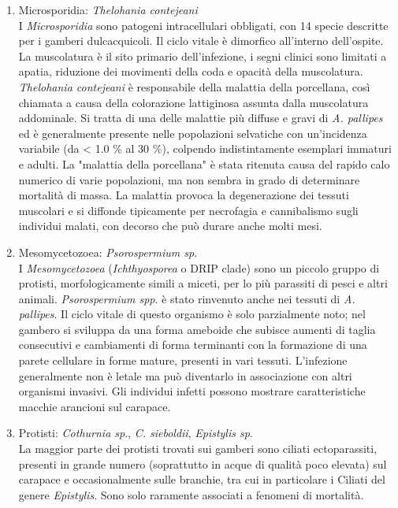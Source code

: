 \documentclass[11pt,a4paper,italian,twoside,openany]{memoir}
\begin{document}
\begin{enumerate}[label={\alph*)}]
  \item Microsporidia: \emph{Thelohania contejeani}\\ 
  I \emph{Microsporidia} sono patogeni intracellulari obbligati, con 14 specie descritte per i gamberi dulcacquicoli. Il ciclo vitale è dimorfico all'interno dell'ospite. La muscolatura è il sito primario dell'infezione, i segni clinici sono limitati a apatia, riduzione dei movimenti della coda e opacità della muscolatura. \emph{Thelohania contejeani} è responsabile della malattia della porcellana, così chiamata a causa della colorazione lattiginosa assunta dalla muscolatura addominale. Si tratta di una delle malattie più diffuse e gravi di \emph{A. pallipes} ed è generalmente presente nelle popolazioni selvatiche con un'incidenza variabile (da < 1.0 \% al 30 \%), colpendo indistintamente esemplari immaturi e adulti. La "malattia della porcellana" è stata ritenuta causa del rapido calo numerico di varie popolazioni, ma non sembra in grado di determinare mortalità di massa. La malattia provoca la degenerazione dei tessuti muscolari e si diffonde tipicamente per necrofagia e cannibalismo sugli individui malati, con decorso che può durare anche molti mesi. 
  \item Mesomycetozoea: \emph{Psorospermium sp}.\\ 
  I \emph{Mesomycetozoea} (\emph{Ichthyosporea} o DRIP clade) sono un piccolo gruppo di protisti, morfologicamente simili a miceti, per lo più parassiti di pesci e altri animali. \emph{Psorospermium spp}. è stato rinvenuto anche nei tessuti di \emph{A. pallipes}. Il ciclo vitale di questo organismo è solo parzialmente noto; nel gambero si sviluppa da una forma ameboide che subisce aumenti di taglia consecutivi e cambiamenti di forma terminanti con la formazione di una parete cellulare in forme mature, presenti in vari tessuti. L'infezione generalmente non è letale ma può diventarlo in associazione con altri organismi invasivi. Gli individui infetti possono mostrare caratteristiche macchie arancioni sul carapace.

  \item Protisti: \emph{Cothurnia sp}., \emph{C. sieboldii}, \emph{Epistylis sp}.\\ 
  La maggior parte dei protisti trovati sui gamberi sono ciliati ectoparassiti, presenti in grande numero (soprattutto in acque di qualità poco elevata) sul carapace e occasionalmente sulle branchie, tra cui in particolare i Ciliati del genere \emph{Epistylis}. Sono solo raramente associati a fenomeni di mortalità.


\end{enumerate}
\end{document}
